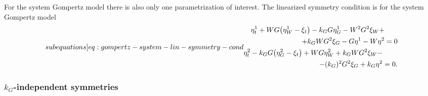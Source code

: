 For the system Gompertz model there is also only one parametrization of interest.
The linearized symmetry condition  is for the system Gompertz model
\begin{subequations} \label[subequations]{eq:gompertz-system-lin-symmetry-cond}
  \begin{align}
    \begin{split}\label{eq:gompertz-system-lin-symmetry-cond-a}
      \eta^1_t + W G \left(\eta^1_W - \xi_t\right) -k_G G \eta^1_G - W^2 G^2 \xi_W +&\\+ k_G W G^2 \xi_G - G \eta^1 - W \eta^2 &= 0 
    \end{split}\\
    \begin{split}\label{eq:gompertz-system-lin-symmetry-cond-b}
      \eta^2_t - k_G G \left(\eta^2_G - \xi_t\right) + W G \eta^2_W + k_G W G^2 \xi_W -&\\- (k_G)^2 G^2 \xi_G + k_G \eta^2 &= 0. 
    \end{split}
  \end{align}
\end{subequations}

\subsubsection{\texorpdfstring{\(k_G\)-independent symmetries}{Growth rate-independent symmetries}}

